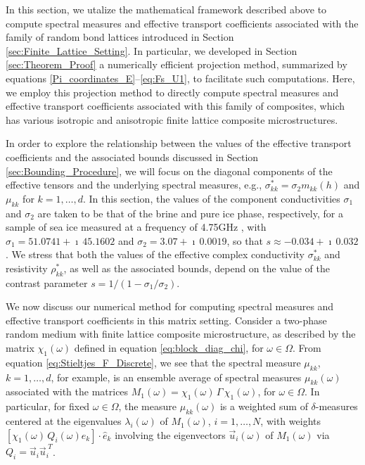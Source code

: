 \documentclass{cmslatex}
\begin{document}
In this section, we utalize the mathematical framework described above
to compute spectral measures and effective transport coefficients
associated with the family of random bond lattices introduced in
Section \ref{sec:Finite_Lattice_Setting}. In particular, 
we developed in Section \ref{sec:Theorem_Proof} a numerically
efficient projection method, summarized by equations
\eqref{Pi_coordinates_E}--\eqref{eq:Fs_U1}, to facilitate such 
computations. Here, we employ this projection method to directly
compute spectral measures and effective transport coefficients
associated with this family of composites, which has various isotropic
and anisotropic finite lattice composite microstructures.





In order to explore the relationship between the values of the
effective transport coefficients and the associated bounds discussed
in Section \ref{sec:Bounding_Procedure}, we will focus on the diagonal
components of the effective tensors and the underlying spectral
measures, e.g., $\sigma^*_{kk}=\sigma_2m_{kk}(h)$ and $\mu_{kk}$ for $k=1,\ldots,d$. In
this section, the values of the component conductivities $\sigma_1$ and
$\sigma_2$ are taken to be that of the brine and pure ice phase,
respectively, for a sample of sea ice measured at a frequency of
4.75GHz \cite{Backstrom:2007:Book}, with $\sigma_1=51.0741+\imath\,45.1602$ and
$\sigma_2=3.07+\imath\,0.0019$, so that $s\approx-0.034+\imath\,0.032$. We stress that both
the values of the effective complex conductivity $\sigma^*_{kk}$ and
resistivity $\rho^*_{kk}$, as well as the associated bounds, depend on the
value of the contrast parameter $s=1/(1-\sigma_1/\sigma_2)$. 



We now discuss our numerical method for computing spectral
measures and effective transport coefficients in this matrix setting. 
Consider a two-phase random medium with finite lattice composite
microstructure, as described by the matrix $\chi_1(\omega)$ defined in
equation \eqref{eq:block_diag_chi}, for $\omega\in\Omega$. From
equation \eqref{eq:Stieltjes_F_Discrete}, we see that the spectral
measure $\mu_{kk}$, $k=1,\ldots,d$, for example, is an ensemble average of
spectral measures $\mu_{kk}(\omega)$ associated with the matrices
$M_1(\omega)=\chi_1(\omega)\,\Gamma\,\chi_1(\omega)$, for $\omega\in\Omega$. In particular, for fixed $\omega\in\Omega$,
the measure  $\mu_{kk}(\omega)$ is a weighted sum of $\delta$-measures centered at
the eigenvalues $\lambda_i(\omega)$ of $M_1(\omega)$, $i=1,\ldots,N$, with weights
$[\chi_1(\omega)\,Q_i(\omega)\hat{e}_k]\cdot\hat{e}_k$ involving the eigenvectors 
$\vec{u}_i(\omega)$ of $M_1(\omega)$ via $Q_i=\vec{u}_i\vec{u}_i^{\;T}$.
\end{document}
